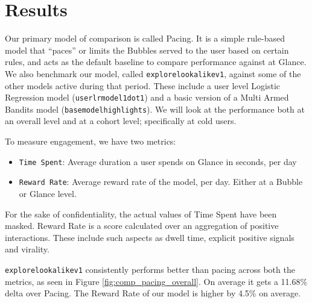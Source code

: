 \section{Results}

Our primary model of comparison is called Pacing. It is a simple rule-based model that “paces” or limits the Bubbles served to the user based on certain rules, and acts as the default baseline to compare performance against at Glance. We also benchmark our model, called {\verb|explorelookalikev1|}, against some of the other models active during that period. These include a user level Logistic Regression model ({\verb|userlrmodel1dot1|}) and a basic version of a Multi Armed Bandits model ({\verb|basemodelhighlights|}). We will look at the performance both at an overall level and at a cohort level; specifically at cold users. 

To measure engagement, we have two metrics: 
\begin{itemize}
    \item {\verb|Time Spent|}: Average duration a user spends on Glance in seconds, per day
    \item {\verb|Reward Rate|}: Average reward rate of the model, per day. Either at a Bubble or Glance level.
\end{itemize}

For the sake of confidentiality, the actual values of Time Spent have been masked. Reward Rate is a score calculated over an aggregation of positive interactions. These include such aspects as dwell time, explicit positive signals and virality.  

{\verb|explorelookalikev1|} consistently performs better than pacing across both the metrics, as seen in Figure \ref{fig:comp_pacing_overall}. On average it gets a 11.68\% delta over Pacing. The Reward Rate of our model is higher by 4.5\% on average.

